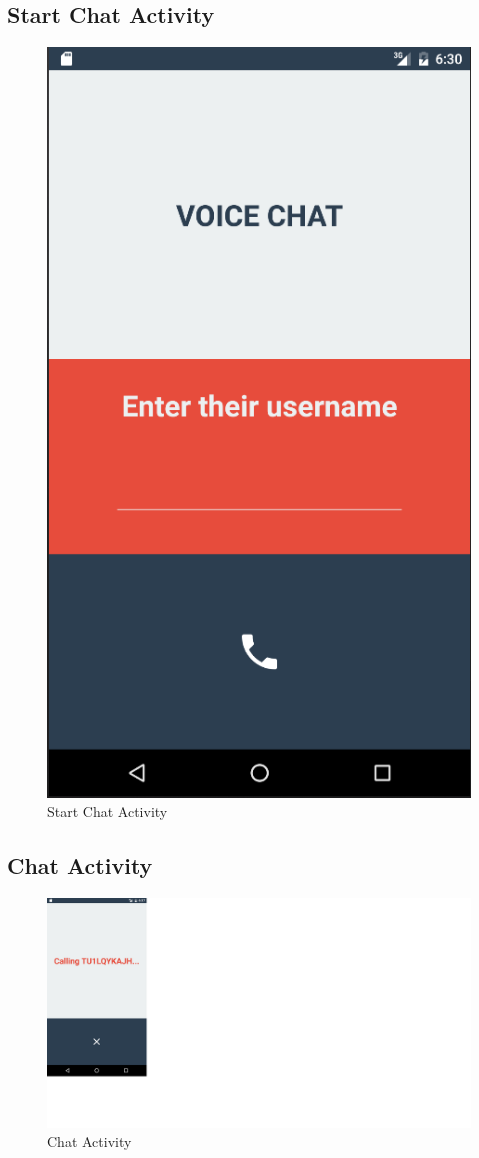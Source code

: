 \documentclass[]{report}
\begin{document}
		\subsection{Start Chat Activity}
			\begin{figure}[H]
				\caption{Start Chat Activity}
				\centering
				\includegraphics[scale=0.35]{StartChatActivity.png}
			\end{figure}
		\subsection{Chat Activity}
			\begin{figure}[H]
				\caption{Chat Activity}
				\includegraphics[scale=0.35]{ChatActivity.png}
			\end{figure}
\end{document}
